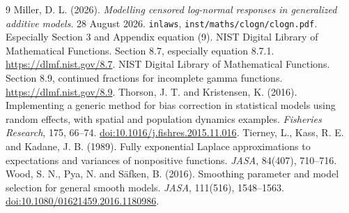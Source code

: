 \documentclass[11pt,a4paper]{article}
\newcommand{\code}[1]{\texttt{#1}}
\begin{document}
\begin{thebibliography}{9}\small
{} Miller, D. L. (2026).
\emph{Modelling censored log-normal responses in generalized additive models}.
28 August 2026. \code{inlaws}, \code{inst/maths/clogn/clogn.pdf}.
Especially Section 3 and Appendix equation (9).
 NIST Digital Library of Mathematical Functions.
Section 8.7, especially equation 8.7.1.
\url{https://dlmf.nist.gov/8.7}.
 NIST Digital Library of Mathematical Functions.
Section 8.9, continued fractions for incomplete gamma functions.
\url{https://dlmf.nist.gov/8.9}.
 Thorson, J. T. and Kristensen, K. (2016).
Implementing a generic method for bias correction in statistical models using
random effects, with spatial and population dynamics examples.
\emph{Fisheries Research}, 175, 66--74.
\href{https://doi.org/10.1016/j.fishres.2015.11.016}{doi:10.1016/j.fishres.2015.11.016}.
 Tierney, L., Kass, R. E. and Kadane, J. B. (1989).
Fully exponential Laplace approximations to expectations and variances of
nonpositive functions. \emph{JASA}, 84(407), 710--716.
 Wood, S. N., Pya, N. and S\"afken, B. (2016).
Smoothing parameter and model selection for general smooth models.
\emph{JASA}, 111(516), 1548--1563.
\href{https://doi.org/10.1080/01621459.2016.1180986}{doi:10.1080/01621459.2016.1180986}.
\end{thebibliography}
\end{document}
